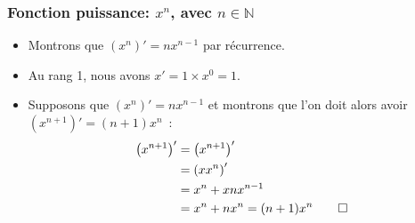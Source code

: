 \documentclass[10pt,notheorems]{beamer}
\theoremstyle{plain}
\theoremstyle{definition} %
\begin{document}
\begin{frame}
  \frametitle{Fonction puissance: $x^n$, avec $n\in\mathbb N$}

  \begin{itemize}

  \item Montrons que $\left(x^n\right)' = nx^{n-1}$ par récurrence.\newline

  \item Au rang 1, nous avons $x' = 1\times x^0 = 1$.\newline

  \item Supposons que $\left(x^n\right)' = nx^{n-1}$ et montrons que l'on doit alors avoir $\left(x^{n+1}\right)' = (n+1)x^{n}$~:
    \[
      \begin{split}
        \left(x^{n+1}\right)' &= \left(x^{n+1}\right)'\\
        &=\left(xx^{n}\right)'\\
        &=x^n + x n x^{n-1}\\
        &=x^n + n x^{n} = (n+1)x^{n}\qed
      \end{split}
    \]

  \end{itemize}
\end{frame}
\end{document}

